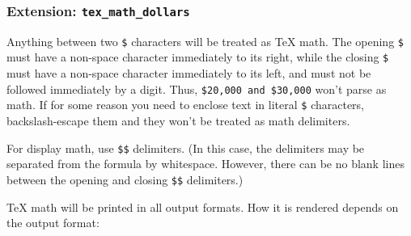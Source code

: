 \documentclass[
]{article}
\begin{document}
\hypertarget{extension-tex_math_dollars}{%
\subsubsection{\texorpdfstring{Extension:
\texttt{tex\_math\_dollars}}{Extension: tex\_math\_dollars}}\label{extension-tex_math_dollars}}

Anything between two \texttt{\$} characters will be treated as TeX math.
The opening \texttt{\$} must have a non-space character immediately to
its right, while the closing \texttt{\$} must have a non-space character
immediately to its left, and must not be followed immediately by a
digit. Thus, \texttt{\$20,000\ and\ \$30,000} won't parse as math. If
for some reason you need to enclose text in literal \texttt{\$}
characters, backslash-escape them and they won't be treated as math
delimiters.

For display math, use \texttt{\$\$} delimiters. (In this case, the
delimiters may be separated from the formula by whitespace. However,
there can be no blank lines between the opening and closing
\texttt{\$\$} delimiters.)

TeX math will be printed in all output formats. How it is rendered
depends on the output format:
\end{document}

